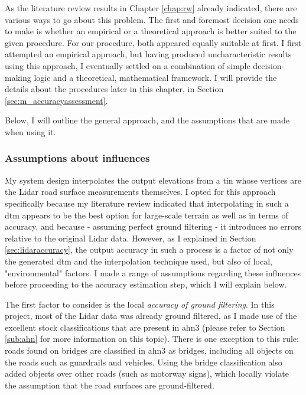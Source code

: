 As the literature review results in Chapter \ref{chap:rw} already indicated, there are various ways to go about this problem. The first and foremost decision one needs to make is whether an empirical or a theoretical approach is better suited to the given procedure. For our procedure, both appeared equally suitable at first. I first attempted an empirical approach, but having produced uncharacteristic results using this approach, I eventually settled on a combination of simple decision-making logic and a theoretical, mathematical framework. I will provide the details about the procedures later in this chapter, in Section \ref{sec:m_accuracyassessment}.

Below, I will outline the general approach, and the assumptions that are made when using it.

\subsubsection{Assumptions about influences}

My system design interpolates the output elevations from a \ac{tin} whose vertices are the Lidar road surface measurements themselves. I opted for this approach specifically because my literature review indicated that interpolating in such a \ac{dtm} appears to be the best option for large-scale terrain as well as in terms of accuracy, and because - assuming perfect ground filtering - it introduces no errors relative to the original Lidar data. However, as I explained in Section \ref{sec:lidaraccuracy}, the output accuracy in such a process is a factor of not only the generated \ac{dtm} and the interpolation technique used, but also of local, "environmental" factors. I made a range of assumptions regarding these influences before proceeding to the accuracy estimation step, which I will explain below.

The first factor to consider is the local \textit{accuracy of ground filtering}. In this project, most of the Lidar data was already ground filtered, as I made use of the excellent stock classifications that are present in \ac{ahn3} (please refer to Section \ref{sub:ahn} for more information on this topic). There is one exception to this rule: roads found on bridges are classified in \ac{ahn3} as bridges, including all objects on the roads such as guardrails and vehicles. Using the bridge classification also added objects over other roads (such as motorway signs), which locally violate the assumption that the road surfaces are ground-filtered.

